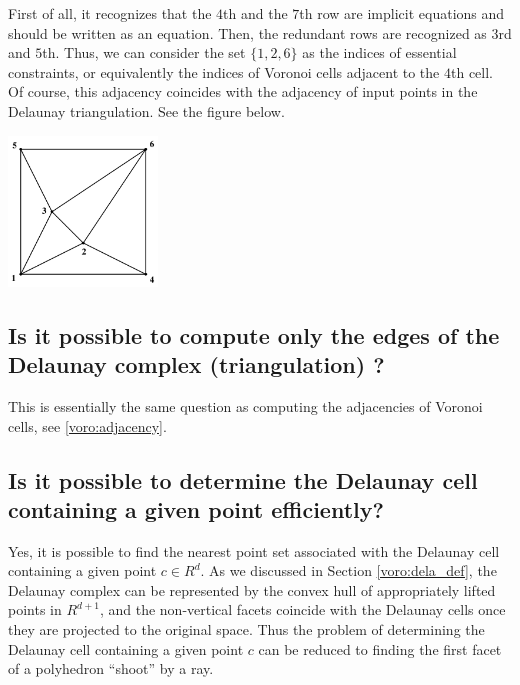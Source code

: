 \documentclass[[a4paper,12pt]{article}
\begin{document}
\begin{small}
First of all, it recognizes that the $4$th and the $7$th row
are implicit equations and should be written as an equation.
Then, the redundant rows are recognized as $3$rd and $5$th.  Thus, we can
consider the set $\{1, 2, 6\}$ as the indices of essential constraints, or
equivalently the indices of Voronoi cells adjacent to the $4$th
cell.  Of course, this adjacency coincides with the adjacency
of input points in the Delaunay triangulation.
See the figure below.

\bigskip
\begin{center}
\includegraphics[height=40mm]{vtest_draw_de}
\end{center}


\end{small}

\subsection{Is it possible to compute only the edges of the Delaunay complex
(triangulation) ?} \label{voro:de_adjacency}

This is essentially the same question as computing
the adjacencies of Voronoi cells, see \ref{voro:adjacency}.

\subsection{Is it possible to determine the Delaunay cell containing
a given point efficiently?}
\label{dela:cellbylp}

Yes, it is possible to find the nearest point set associated
with the Delaunay cell containing a given point $c\in R^d$.
As we discussed in Section \ref{voro:dela_def}, the Delaunay
complex can be represented by the convex hull of appropriately
lifted points in $R^{d+1}$, and the non-vertical facets coincide with
the Delaunay cells once they are projected to the original space.
Thus the problem of determining the Delaunay cell containing a given
point $c$ can be reduced to finding the first facet of a polyhedron
``shoot'' by a ray.
\end{document}
